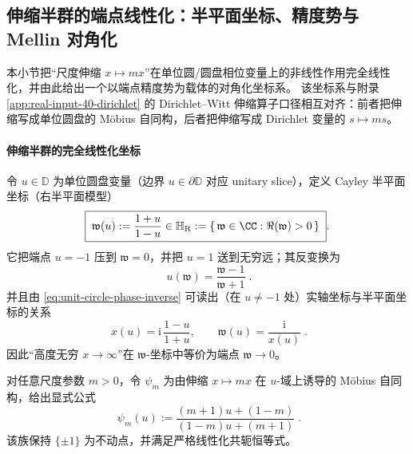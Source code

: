\subsection{伸缩半群的端点线性化：半平面坐标、精度势与 Mellin 对角化}\label{subsec:unit-circle-scale-linearization}
本小节把“尺度伸缩 \(x\mapsto mx\)”在单位圆/圆盘相位变量上的非线性作用完全线性化，并由此给出一个以端点精度势为载体的对角化坐标系。
该坐标系与附录 \ref{app:real-input-40-dirichlet} 的 Dirichlet--Witt 伸缩算子口径相互对齐：前者把伸缩写成单位圆盘的 Möbius 自同构，后者把伸缩写成 Dirichlet 变量的 \(s\mapsto ms\)。

\paragraph{伸缩半群的完全线性化坐标}
令 \(u\in\mathbb{D}\) 为单位圆盘变量（边界 \(u\in\partial\mathbb{D}\) 对应 unitary slice），定义 Cayley 半平面坐标（右半平面模型）
\begin{equation}\label{eq:scale-linearization-halfplane-coordinate}
\boxed{\;
\mathfrak{w}(u):=\frac{1+u}{1-u}\in\mathbb{H}_{\mathrm{R}}:=\{\,\mathfrak{w}\in\CC:\Re(\mathfrak{w})>0\,\}\; }.
\end{equation}
它把端点 \(u=-1\) 压到 \(\mathfrak{w}=0\)，并把 \(u=1\) 送到无穷远；其反变换为
\begin{equation}\label{eq:scale-linearization-halfplane-inverse}
\boxed{\;u(\mathfrak{w})=\frac{\mathfrak{w}-1}{\mathfrak{w}+1}\; }.
\end{equation}
并且由 \eqref{eq:unit-circle-phase-inverse} 可读出（在 \(u\neq-1\) 处）实轴坐标与半平面坐标的关系
\begin{equation}\label{eq:scale-linearization-w-vs-x}
\boxed{\;
x(u)=\mathrm{i}\,\frac{1-u}{1+u},
\qquad
\mathfrak{w}(u)=\frac{\mathrm{i}}{x(u)}\; }.
\end{equation}
因此“高度无穷 \(x\to\infty\)”在 \(\mathfrak{w}\)-坐标中等价为端点 \(\mathfrak{w}\to 0\)。

\medskip
对任意尺度参数 \(m>0\)，令 \(\psi_m\) 为由伸缩 \(x\mapsto mx\) 在 \(u\)-域上诱导的 Möbius 自同构，给出显式公式
\begin{equation}\label{eq:scale-psi-m}
\boxed{\;
\psi_m(u):=\frac{(m+1)u+(1-m)}{(1-m)u+(m+1)}\; }.
\end{equation}
该族保持 \(\{\pm 1\}\) 为不动点，并满足严格线性化共轭恒等式。

